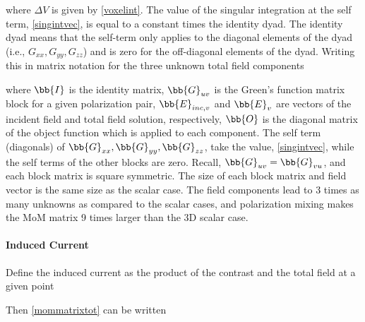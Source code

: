 \noindent where $\Delta V$ is given by \eqref{voxelint}. The value of the singular integration at the self term, \eqref{singintvec}, is equal to a constant times the identity dyad. The identity dyad means that the self-term only applies to the diagonal elements of the dyad (i.e., $G_{xx}, G_{yy}, G_{zz}$) and is zero for the off-diagonal elements of the dyad. Writing this in matrix notation for the three unknown total field components 

\noindent where $\bb{I}$ is the identity matrix, $\bb{G}_{uv}$ is the Green's function matrix block for a given polarization pair, $\bb{E}_{inc,v}$ and $\bb{E}_{v}$ are vectors of the incident field and total field solution, respectively, $\bb{O}$ is the diagonal matrix of the object function which is applied to each component. The self term (diagonals) of $\bb{G}_{xx}, \bb{G}_{yy}, \bb{G}_{zz}$, take the value, \eqref{singintvec}, while the self terms of the other blocks are zero. Recall, $\bb{G}_{uv} = \bb{G}_{vu}$, and each block matrix is square symmetric. The size of each block matrix and field vector is the same size as the scalar case. The field components lead to 3 times as many unknowns as compared to the scalar cases, and polarization mixing makes the MoM matrix 9 times larger than the 3D scalar case. 


\paragraph{Induced Current}

Define the induced current as the product of the contrast and the total field at a given point

Then \eqref{mommatrixtot} can be written 


